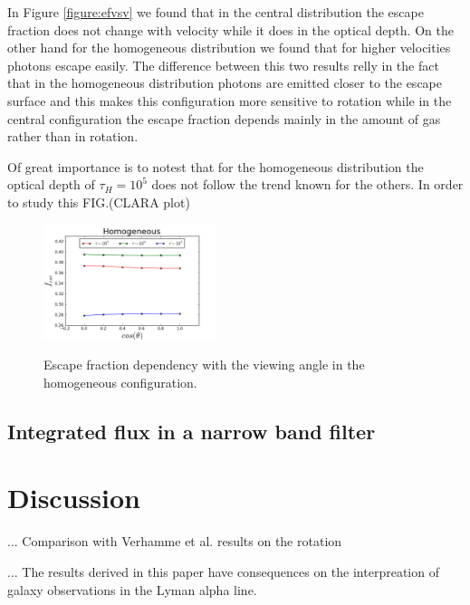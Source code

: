 \documentclass[usenatbib]{mn2e}
\begin{document}
In Figure \ref{figure:efvsv} we found that in the central distribution
the escape fraction does not change with velocity while it does in the
optical depth. On the other hand for the homogeneous distribution we
found that for higher velocities photons escape easily. The difference
between this two results relly in the fact that in the homogeneous
distribution photons are emitted closer to the escape surface and this
makes this configuration more sensitive to rotation while in the
central configuration the escape fraction depends mainly in the amount
of gas rather than in rotation. 

Of great importance is to notest that for the homogeneous distribution the optical depth of $\tau_{H}=10^5$ does not follow the trend known for the others. In order to study this FIG.(CLARA plot) 

\begin{figure}
  \includegraphics[width=0.45\textwidth]{FEHomogeneousvsThetaL.png}
 \label{figure:efvstheta}\caption{Escape fraction dependency with the viewing angle in the homogeneous configuration.} 
\end{figure}

\subsection{Integrated flux in a narrow band filter}


\section{Discussion}
\label{sec:discussion}

... Comparison with Verhamme et al. results on the rotation

... The results derived in this paper have consequences on the
interpreation of galaxy observations in the Lyman alpha line.
\end{document}
